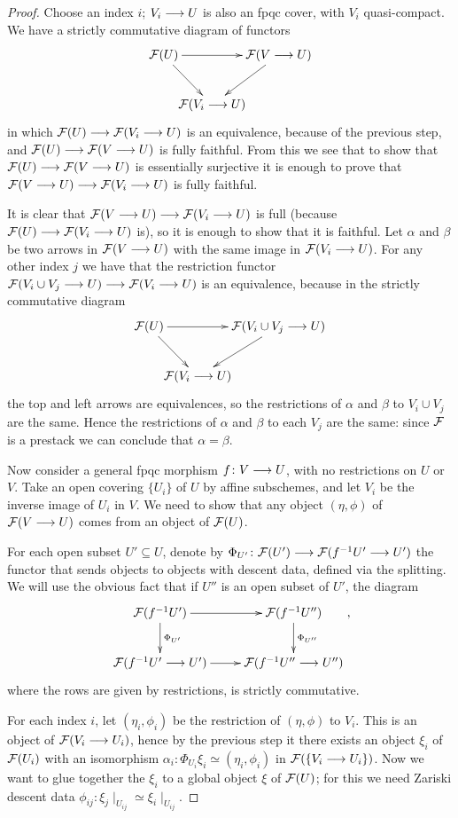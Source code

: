 \begin{4   STACKS}
\begin{4.2 Descent for quasi-coherent sheaves}
\begin{proof}
Choose an index $i$; $V_{i} \arr U$ is also an fpqc cover, with $V_{i}$ quasi-compact. We have a strictly commutative diagram of functors
   \[
   \xymatrix@C-30pt{
   {}\cF(U) \ar[rr] \ar[rd] && {}\cF(V \to U) \ar[ld] \\
   &{}\cF(V_{i} \to U)
   }
   \]
in which $\cF(U) \arr \cF(V_{i} \to U)$ is an equivalence, because of the previous step, and $\cF(U) \arr \cF(V \to U)$ is fully faithful. From this we see that to show that $\cF(U) \arr \cF(V \to U)$ is essentially surjective it is enough to prove that $\mathcal{F}(V \longrightarrow U) \longrightarrow \mathcal{F}(V_{i} \longrightarrow U)$ is fully faithful.

It is clear that $\mathcal{F}(V \longrightarrow U) \longrightarrow \mathcal{F}(V_{i} \longrightarrow U)$ is full (because $\cF(U) \arr \cF(V_{i} \to U)$ is), so it is enough to show that it is faithful. Let $\alpha$ and $\beta$ be two arrows in $\mathcal{F}(V \longrightarrow U)$ with the same image in $\mathcal{F}(V_{i} \longrightarrow U)$. For any other index $j$ we have that the restriction functor $\mathcal{F}(V_{i} \cup V_{j} \longrightarrow U) \longrightarrow \mathcal{F}(V_{i} \longrightarrow U)$ is an equivalence, because in the strictly commutative diagram
   \[
   \xymatrix@C-30pt{
   {}\cF(U) \ar[rr] \ar[rd] && {}\cF(V_{i}\cup V_{j} \to U) \ar[ld] \\
   &{}\cF(V_{i} \to U)
   }
   \]
the top and left arrows are equivalences, so the restrictions of $\alpha$ and $\beta$ to $V_{i} \cup V_{j}$ are the same. Hence the restrictions of $\alpha$ and $\beta$ to each $V_{j}$ are the same: since $\mathcal{F}$ is a prestack we can conclude that $\alpha = \beta$.


 Now consider a general fpqc morphism $f\colon V \arr U$, with no restrictions on $U$ or $V$. Take an open covering $\{U_{i}\}$ of $U$ by affine subschemes, and let $V_{i}$ be the inverse image of $U_{i}$ in $V$. We need to show that any object $(\eta, \phi)$ of $\mathcal{F}(V \longrightarrow U)$ comes from an object of $\mathcal{F}(U)$. 

For each open subset $U' \subseteq U$, denote by $\Phi_{U'}\colon \cF(U') \arr \cF(f^{-1}U' \to U')$ the functor that sends objects to objects with descent data, defined via the splitting. We will use the obvious fact that if $U''$ is an open subset of $U'$, the diagram
   \[
   \xymatrix{
   {}\cF(f^{-1}U') \ar[r]\ar[d]^{\Phi_{U'}}    
      & {}\cF(f^{-1}U'')\ar[d]^{\Phi_{U''}} \\
   {}\cF(f^{-1}U'\to U') \ar[r] & {}\cF(f^{-1}U''\to U'')
   },
   \]
where the rows are given by restrictions, is strictly commutative.

For each index $i$, let $(\eta_{i}, \phi_{i})$ be the restriction of $(\eta, \phi)$ to $V_{i}$. This is an object of $\mathcal{F}(V_{i} \longrightarrow U_{i})$, hence by the previous step it there exists an object $\xi_{i}$ of $\mathcal{F}(U_{i})$ with an isomorphism $\alpha_{i}\colon \Phi_{U_{i}}\xi_{i} \simeq (\eta_{i}, \phi_{i})$ in $\mathcal{F}(\{V_{i} \longrightarrow U_{i}\})$. Now we want to glue together the $\xi_{i}$ to a global object $\xi$ of $\mathcal{F}(U)$; for this we need Zariski descent data $\phi_{ij}\colon \xi_{j}\mid_{U_{ij}} \simeq \xi_{i}\mid_{U_{ij}}$.


\end{proof}
\end{4.2 Descent for quasi-coherent sheaves}
\end{4   STACKS}
